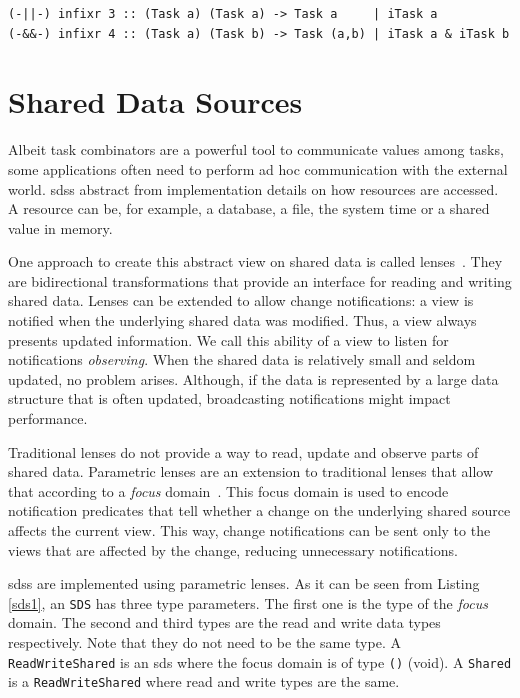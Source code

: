 \begin{lstlisting}[caption=Parallel combinators,label=par_comb,captionpos=b]
(-||-) infixr 3 :: (Task a) (Task a) -> Task a     | iTask a
(-&&-) infixr 4 :: (Task a) (Task b) -> Task (a,b) | iTask a & iTask b
\end{lstlisting}


\section{Shared Data Sources}

Albeit task combinators are a powerful tool to 
communicate values among tasks, some applications often need to perform ad hoc communication with the external world. \acp{sds} abstract from implementation details on how resources are accessed. A resource can be, for example, a database, a file, the system time or a shared value in memory. 

One approach to create this abstract view on shared data is called lenses~\cite{lenses}. They are bidirectional transformations that provide an interface for reading and writing shared data. Lenses can be extended to allow change notifications: a view is notified when the underlying shared data was modified. Thus, a view always presents updated information. We call this ability of a view to listen for notifications \textit{observing}. When the shared data is relatively small and seldom updated, no problem arises. Although, if the data is represented by a large data structure that is often updated, broadcasting notifications might impact performance. 

Traditional lenses do not provide a way to read, update and observe parts of shared data. Parametric lenses are an extension to traditional lenses that allow that according to a \textit{focus} domain~\cite{parametric}. This focus domain is used to encode notification predicates that tell whether a change on the underlying shared source affects the current view. This way, change notifications can be sent only to the views that are affected by the change, reducing unnecessary notifications.

\acp{sds} are implemented using parametric lenses. As it can be seen from Listing \ref{sds1}, an \texttt{SDS} has three type parameters. The first one is the type of the \textit{focus} domain. The second and third types are the read and write data types respectively. Note that they do not need to be the same type. A \texttt{ReadWriteShared} is an \ac{sds} where the focus domain is of type \texttt{()} (void). A \texttt{Shared} is a \texttt{ReadWriteShared} where read and write types are the same.

